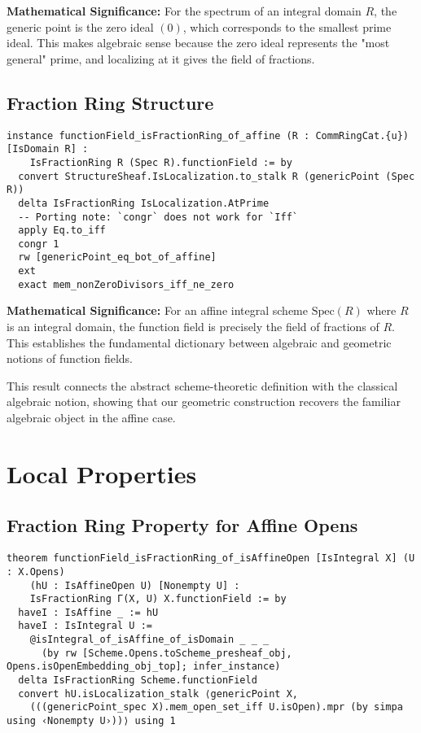 \documentclass{article}
\theoremstyle{definition}
\begin{document}
\textbf{Mathematical Significance:} For the spectrum of an integral domain $R$, the generic point is the zero ideal $(0)$, which corresponds to the smallest prime ideal. This makes algebraic sense because the zero ideal represents the "most general" prime, and localizing at it gives the field of fractions.

\subsection{Fraction Ring Structure}

\begin{lstlisting}
instance functionField_isFractionRing_of_affine (R : CommRingCat.{u}) [IsDomain R] :
    IsFractionRing R (Spec R).functionField := by
  convert StructureSheaf.IsLocalization.to_stalk R (genericPoint (Spec R))
  delta IsFractionRing IsLocalization.AtPrime
  -- Porting note: `congr` does not work for `Iff`
  apply Eq.to_iff
  congr 1
  rw [genericPoint_eq_bot_of_affine]
  ext
  exact mem_nonZeroDivisors_iff_ne_zero
\end{lstlisting}

\textbf{Mathematical Significance:} For an affine integral scheme $\mathrm{Spec}(R)$ where $R$ is an integral domain, the function field is precisely the field of fractions of $R$. This establishes the fundamental dictionary between algebraic and geometric notions of function fields.

This result connects the abstract scheme-theoretic definition with the classical algebraic notion, showing that our geometric construction recovers the familiar algebraic object in the affine case.

\section{Local Properties}

\subsection{Fraction Ring Property for Affine Opens}

\begin{lstlisting}
theorem functionField_isFractionRing_of_isAffineOpen [IsIntegral X] (U : X.Opens)
    (hU : IsAffineOpen U) [Nonempty U] :
    IsFractionRing Γ(X, U) X.functionField := by
  haveI : IsAffine _ := hU
  haveI : IsIntegral U :=
    @isIntegral_of_isAffine_of_isDomain _ _ _
      (by rw [Scheme.Opens.toScheme_presheaf_obj, Opens.isOpenEmbedding_obj_top]; infer_instance)
  delta IsFractionRing Scheme.functionField
  convert hU.isLocalization_stalk ⟨genericPoint X,
    (((genericPoint_spec X).mem_open_set_iff U.isOpen).mpr (by simpa using ‹Nonempty U›))⟩ using 1
\end{lstlisting}
\end{document}
